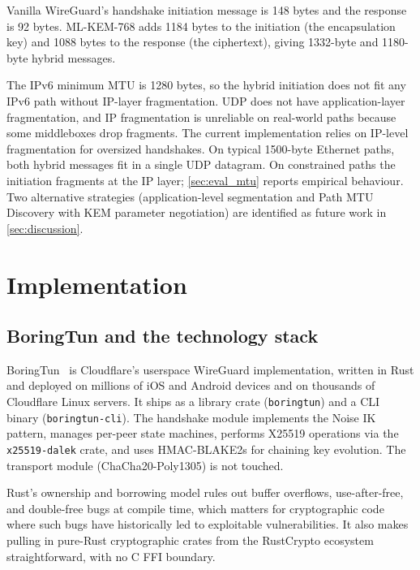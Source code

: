 \documentclass[11pt,a4paper]{article}
\begin{document}
Vanilla WireGuard's handshake initiation message is 148 bytes and the response is 92 bytes. ML-KEM-768 adds 1184 bytes to the initiation (the encapsulation key) and 1088 bytes to the response (the ciphertext), giving 1332-byte and 1180-byte hybrid messages.

The IPv6 minimum MTU is 1280 bytes, so the hybrid initiation does not fit any IPv6 path without IP-layer fragmentation. UDP does not have application-layer fragmentation, and IP fragmentation is unreliable on real-world paths because some middleboxes drop fragments. The current implementation relies on IP-level fragmentation for oversized handshakes. On typical 1500-byte Ethernet paths, both hybrid messages fit in a single UDP datagram. On constrained paths the initiation fragments at the IP layer; \cref{sec:eval_mtu} reports empirical behaviour. Two alternative strategies (application-level segmentation and Path MTU Discovery with KEM parameter negotiation) are identified as future work in \cref{sec:discussion}.

\section{Implementation}
\label{sec:implementation}

\subsection{BoringTun and the technology stack}

BoringTun~\cite{boringtun} is Cloudflare's userspace WireGuard implementation, written in Rust and deployed on millions of iOS and Android devices and on thousands of Cloudflare Linux servers. It ships as a library crate (\texttt{boringtun}) and a CLI binary (\texttt{boringtun-cli}). The handshake module implements the Noise IK pattern, manages per-peer state machines, performs X25519 operations via the \texttt{x25519-dalek} crate, and uses HMAC-BLAKE2s for chaining key evolution. The transport module (ChaCha20-Poly1305) is not touched.

Rust's ownership and borrowing model rules out buffer overflows, use-after-free, and double-free bugs at compile time, which matters for cryptographic code where such bugs have historically led to exploitable vulnerabilities. It also makes pulling in pure-Rust cryptographic crates from the RustCrypto ecosystem straightforward, with no C FFI boundary.
\end{document}
